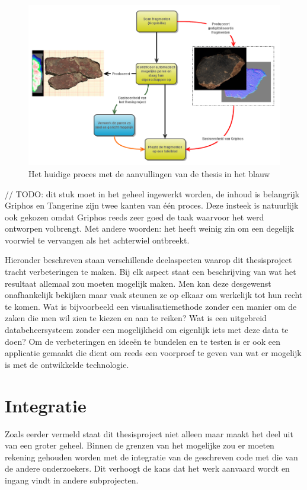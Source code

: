 \begin{figure}[ht]
	\begin{center}
		\includegraphics[width=1.0\columnwidth]{images/flowchart-focus-01.png}
		\caption{Het huidige proces met de aanvullingen van de thesis in het blauw}
		\label{fig:flow}
	\end{center}
\end{figure}

// TODO: dit stuk moet in het geheel ingewerkt worden, de inhoud is belangrijk
Griphos en Tangerine zijn twee kanten van \'e\'en proces.
Deze insteek is natuurlijk ook gekozen omdat Griphos reeds zeer goed de taak waarvoor het werd ontworpen volbrengt. Met andere woorden: het heeft weinig zin om een degelijk voorwiel te vervangen als het achterwiel ontbreekt.

Hieronder beschreven staan verschillende deelaspecten waarop dit thesisproject tracht verbeteringen te maken. Bij elk aspect staat een beschrijving van wat het resultaat allemaal zou moeten mogelijk maken. Men kan deze desgewenst onafhankelijk bekijken maar vaak steunen ze op elkaar om werkelijk tot hun recht te komen. Wat is bijvoorbeeld een visualisatiemethode zonder een manier om de zaken die men wil zien te kiezen en aan te reiken? Wat is een uitgebreid databeheersysteem zonder een mogelijkheid om eigenlijk iets met deze data te doen? Om de verbeteringen en idee\"en te bundelen en te testen is er ook een applicatie gemaakt die dient om reeds een voorproef te geven van wat er mogelijk is met de ontwikkelde technologie.  

\section{Integratie}
Zoals eerder vermeld staat dit thesisproject niet alleen maar maakt het deel uit van een groter geheel. Binnen de grenzen van het mogelijke zou er moeten rekening gehouden worden met de integratie van de geschreven code met die van de andere onderzoekers. Dit verhoogt de kans dat het werk aanvaard wordt en ingang vindt in andere subprojecten. 

